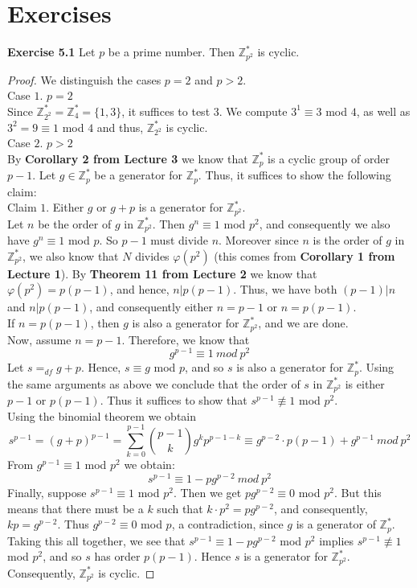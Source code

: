 \documentclass[a4paper]{article}
\begin{document}
\section{Exercises}
\noindent \textbf{Exercise 5.1}  Let $p$ be a prime number. Then $\mathbb{Z}^{*}_{p^2}$ is cyclic.
\begin{proof}
We distinguish the cases $p = 2$ and $p > 2$.\\
Case $1$. $p = 2$\\
Since $\mathbb{Z}_{2^{2}}^{*} = \mathbb{Z}_{4}^{*} = \{1, 3 \}$, it suffices to test $3$. We compute $3^{1} \equiv 3$ mod $4$, as well as $3^2 = 9 \equiv 1$ mod $4$ and thus, $\mathbb{Z}_{2^{2}}^{*}$ is cyclic.\\
Case $2$. $p > 2$\\
By \textbf{Corollary 2 from Lecture 3} we know that $\mathbb{Z}_{p}^{*}$ is a cyclic group of order $p - 1$. Let $g \in \mathbb{Z}_{p}^{*}$ be a generator for $\mathbb{Z}_{p}^{*}$. Thus, it suffices to show the following claim:\\
Claim $1$. Either $g$ or $g + p$ is a generator for $\mathbb{Z}_{p^{2}}^{*}$.\\
Let $n$ be the order of $g$ in $\mathbb{Z}_{p^{2}}^{*}$. Then $g^{n} \equiv 1$ mod $p^{2}$, and consequently we also have $g^{n} \equiv 1$ mod $p$. So $p - 1$ must divide $n$. Moreover since $n$ is the order of $g$ in $\mathbb{Z}_{p^{2}}^{*}$, we also know that $N$ divides $\varphi (p^{2})$ (this comes from \textbf{Corollary 1 from Lecture 1}). By \textbf{Theorem 11 from Lecture 2} we know that $\varphi (p^{2}) = p(p - 1)$, and hence, $n|p(p - 1)$. Thus, we have both $(p - 1)|n$ and $n|p(p - 1)$, and consequently either $n = p - 1$ or $n = p(p - 1)$.\\
If $n = p(p - 1)$, then $g$ is also a generator for $\mathbb{Z}_{p^{2}}^{*}$, and we are done.\\
Now, assume $n = p - 1$. Therefore, we know that
$$g^{p - 1} \equiv 1\ mod\ p^{2}$$
Let $s =_{df} g + p$. Hence, $s \equiv g$ mod $p$, and so $s$ is also a generator for $\mathbb{Z}_{p}^{*}$. Using the same arguments as above we conclude that the order of $s$ in $\mathbb{Z}_{p^{2}}^{*}$ is either $p - 1$ or $p(p - 1)$. Thus it suffices to show that $s^{p - 1} \not \equiv 1$ mod $p^{2}$.\\
Using the binomial theorem we obtain
$$s^{p-1} = (g + p)^{p - 1} = \sum_{k = 0}^{p - 1} \binom{p-1}{k} g^{k}p^{p - 1 - k} \equiv g^{p - 2} \cdot p(p - 1) + g^{p - 1}\ mod\ p^{2}$$
From $g^{p - 1} \equiv 1$ mod $p^{2}$ we obtain:
$$s^{p - 1} \equiv 1 - pg^{p-2}\ mod\ p^{2}$$
Finally, suppose $s^{p - 1} \equiv 1$ mod $p^{2}$. Then we get $pg^{p - 2} \equiv 0$ mod $p^{2}$. But this means that there must be a $k$ such that $k \cdot p^{2} = pg^{p - 2}$, and consequently, $kp = g^{p - 2}$. Thus $g^{p - 2} \equiv 0$ mod $p$, a contradiction, since $g$ is a generator of $\mathbb{Z}_{p}^{*}$.\\
Taking this all together, we see that $s^{p - 1} \equiv 1 - pg^{p-2}$ mod $p^{2}$ implies $s^{p - 1} \not \equiv 1$ mod $p^{2}$, and so $s$ has order $p(p - 1)$. Hence $s$ is a generator for $\mathbb{Z}_{p^{2}}^{*}$. Consequently, $\mathbb{Z}_{p^{2}}^{*}$ is cyclic.
\end{proof}
\end{document}
